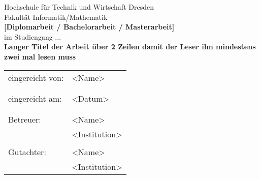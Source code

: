\begin{titlepage}
	\pagestyle{empty}
	\begin{center}
		{\large Hochschule für Technik und Wirtschaft Dresden \\ [0.5cm]}
		{\large Fakultät Informatik/Mathematik \\[3cm]}
		{\Large\bf [Diplomarbeit / Bachelorarbeit / Masterarbeit]\\[1.5cm]}
		{im Studiengang ... \\[3cm]}
	    {\large\bf  Langer Titel der Arbeit über 2 Zeilen damit der Leser ihn mindestens zwei mal lesen muss  \\[4.5 cm]}
	\end{center}
	\begin{tabular}{ll} eingereicht von: & <Name>
		\tabularnewline  & 
		\tabularnewline  & 
		\tabularnewline eingereicht am: & <Datum>
		\tabularnewline  & 
		\tabularnewline  & 
		\tabularnewline Betreuer: & <Name>
		\tabularnewline  & <Institution>
		\tabularnewline  & 
		\tabularnewline Gutachter: & <Name>
		\tabularnewline  & <Institution>
	\end{tabular}
\end{titlepage}
